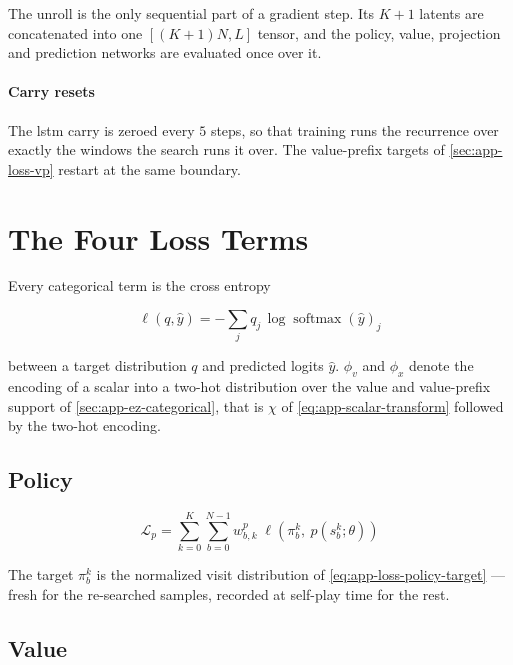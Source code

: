 The unroll is the only sequential part of a gradient step.
Its $K+1$ latents are concatenated into one $[(K{+}1)N,L]$ tensor, and the policy, value,
projection and prediction networks are evaluated once over it.

\paragraph{Carry resets}
The \gls{lstm} carry is zeroed every $5$ steps, so that training runs the recurrence over exactly
the windows the search runs it over.
The value-prefix targets of \cref{sec:app-loss-vp} restart at the same boundary.

\section{The Four Loss Terms}\label{sec:app-loss-terms}

Every categorical term is the cross entropy

\begin{equation}\label{eq:app-loss-crossentropy}
  \ell(q,\hat{y})=-\sum_{j}q_j\,\log\operatorname{softmax}(\hat{y})_j
\end{equation}

between a target distribution $q$ and predicted logits $\hat{y}$.
$\phi_v$ and $\phi_x$ denote the encoding of a scalar into a two-hot distribution over the value
and value-prefix support of \cref{sec:app-ez-categorical}, that is $\chi$ of
\cref{eq:app-scalar-transform} followed by the two-hot encoding.

\subsection{Policy}\label{sec:app-loss-policy}

\begin{equation}\label{eq:app-loss-policy}
  \mathcal{L}_p=\sum_{k=0}^{K}\sum_{b=0}^{N-1}w^p_{b,k}\;
  \ell\!\left(\pi^k_b,\ p(s^k_b;\theta)\right)
\end{equation}

The target $\pi^k_b$ is the normalized visit distribution of
\cref{eq:app-loss-policy-target} --- fresh for the re-searched samples, recorded at self-play time
for the rest.

\subsection{Value}\label{sec:app-loss-value}

